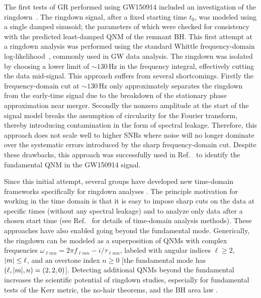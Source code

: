 The first tests of GR performed using GW150914 included an investigation of the ringdown~\cite{LIGOScientific:2016lio}. 
The ringdown signal, after a fixed starting time $t_0$, was modeled using a single damped sinusoid; the parameters of which were checked for consistency with the predicted least-damped QNM of the remnant BH.
This first attempt at a ringdown analysis was performed using the standard Whittle frequency-domain log-likelihood~\cite{10.2307/2983994}, commonly used in GW data analysis.
The ringdown was isolated by choosing a lower limit of $\sim 130\, \mathrm{Hz}$ in the frequency integral, effectively cutting the data mid-signal.
This approach suffers from several shortcomings. 
Firstly the frequency-domain cut at $\sim 130\, \mathrm{Hz}$ only approximately separates the ringdown from the early-time signal due to the breakdown of the stationary phase approximation near merger. 
Secondly the nonzero amplitude at the start of the signal model breaks the assumption of circularity for the Fourier transform, thereby introducing contamination in the form of spectral leakage. 
Therefore, this approach does not scale well to higher SNRs where noise will no longer dominate over the systematic errors introduced by the sharp frequency-domain cut.
Despite these drawbacks, this approach was successfully used in Ref.~\cite{LIGOScientific:2016lio} to identify the fundamental QNM in the GW150914 signal.

Since this initial attempt, several groups have developed new time-domain frameworks specifically for ringdown analyses \cite{Carullo:2019flw, Isi:2019aib, Capano:2021etf}.
The principle motivation for working in the time domain is that it is easy to impose sharp cuts on the data at specific times (without any spectral leakage) and to analyze only data after a chosen start time (see Ref.~\cite{Isi:2021iql} for details of time-domain analysis methods).
These approaches have also enabled going beyond the fundamental mode. 
Generically, the ringdown can be modeled as a superposition of QNMs with complex frequencies $\omega_{\ell m n} = 2\pi f_{\ell m n} - i/\tau_{\ell m n}$, labeled with angular indices $\ell\geq 2$, $\abs{m}\leq\ell$, and an overtone index $n \geq 0$ [the fundamental mode has $(\ell, \abs{m}, n) = (2, 2, 0)$].
Detecting additional QNMs beyond the fundamental increases the scientific potential of ringdown studies, especially for fundamental tests of the Kerr metric, the no-hair theorems, and the BH area law \cite{Dreyer:2003bv, Berti:2005ys, Gossan:2011ha, Brito:2018rfr, Carullo:2019flw, Isi:2019aib, Isi:2020tac}.

